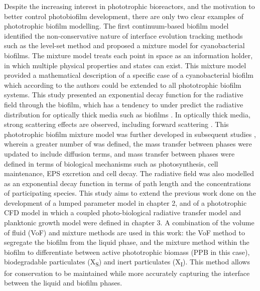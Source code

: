 Despite the increasing interest in phototrophic bioreactors, and the motivation to better control photobiofilm development, there are only two clear examples of phototrophic biofilm modelling. The first continuum-based biofilm model \cite{clarelli2013} identified the non-conservative nature of interface evolution tracking methods such as the level-set method \cite{alpkvist2007} and proposed a mixture model for cyanobacterial biofilms. The mixture model treats each point in space as an information holder, in which multiple physical properties and states can exist. This mixture model provided a mathematical description of a specific case of a cyanobacterial biofilm which according to the authors could be extended to all phototrophic biofilm systems. This study presented an exponential decay function for the radiative field through the biofilm, which has a tendency to under predict the radiative distribution for optically thick media such as biofilms \cite{jarosz2008}. In optically thick media, strong scattering effects are observed, including forward scattering \cite{jarosz2008}. This phototrophic biofilm mixture model was further developed in subsequent studies \cite{polizzi2017}, wherein a greater number of  was defined, the mass transfer between phases were updated to include diffusion terms, and mass transfer between phases were defined in terms of biological mechanisms such as photosynthesis, cell maintenance, EPS excretion and cell decay. The radiative field was also modelled as an exponential decay function in terms of path length and the concentrations of participating species.
\skippingparagraph
This study aims to extend the previous work done on the development of a lumped parameter model in chapter 2, and of a phototrophic CFD model in which a coupled photo-biological radiative transfer model and planktonic growth model were defined in chapter 3. A combination of the volume of fluid (VoF) and mixture methods are used in this work: the VoF method to segregate the biofilm from the liquid phase, and the mixture method within the biofilm to differentiate between active phototrophic biomass (PPB  in this case), biodegradable particulates (X\textsubscript{S}) and inert particulates (X\textsubscript{I}). This method allows for conservation to be maintained while more accurately capturing the interface between the liquid and biofilm phases. 


